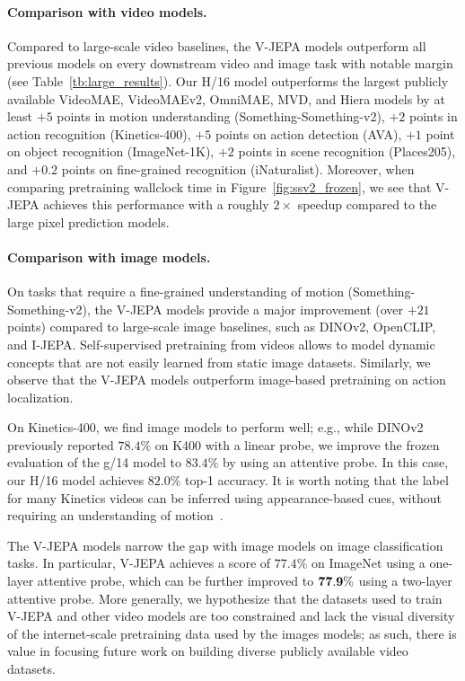 \documentclass[twocolumn]{fairmeta}
\newcommand{\putalg}{{\small V-JEPA}\xspace}
\theoremstyle{plain}
\theoremstyle{definition}
\theoremstyle{remark}
\begin{document}
\paragraph{\bf Comparison with video models.}
Compared to large-scale video baselines, the \putalg models outperform all previous models on every downstream video and image task with notable margin (see Table~\ref{tb:large_results}).
Our H/16 model outperforms the largest publicly available VideoMAE, VideoMAEv2, OmniMAE, MVD, and Hiera models by at least $+5$ points in motion understanding (Something-Something-v2), $+2$ points in action recognition (Kinetics-400), $+5$ points on action detection (AVA), $+1$ point on object recognition (ImageNet-1K), $+2$ points in scene recognition (Places205), and $+0.2$ points on fine-grained recognition (iNaturalist).
Moreover, when comparing pretraining wallclock time in Figure~\ref{fig:ssv2_frozen}, we see that \putalg achieves this performance with a roughly $2\times$ speedup compared to the large pixel prediction models.

\paragraph{\bf Comparison with image models.}
On tasks that require a fine-grained understanding of motion (Something-Something-v2), the \putalg models provide a major improvement (over $+21$ points) compared to large-scale image baselines, such as DINOv2, OpenCLIP, and I-JEPA.
Self-supervised pretraining from videos allows to model dynamic concepts that are not easily learned from static image datasets.
Similarly, we observe that the \putalg models outperform image-based pretraining on action localization.

On Kinetics-400, we find image models to perform well; e.g., while DINOv2~\citep{oquab2023dinov2} previously reported $78.4\%$ on K400 with a linear probe, we improve the frozen evaluation of the g/14 model to $83.4\%$ by using an attentive probe.
In this case, our H/16 model achieves $82.0\%$ top-1 accuracy.
It is worth noting that the label for many Kinetics videos can be inferred using appearance-based cues, without requiring an understanding of motion~\citep{sevilla2021only}.

The \putalg models narrow the gap with image models on image classification tasks.
In particular, \putalg achieves a score of $77.4\%$ on ImageNet using a one-layer attentive probe, which can be further improved to $\bf{77.9\%}$ using a two-layer attentive probe.
More generally, we hypothesize that the datasets used to train \putalg and other video models are too constrained and lack the visual diversity of the internet-scale pretraining data used by the images models; as such, there is value in focusing future work on building diverse publicly available video datasets.
\end{document}
